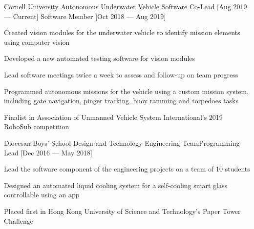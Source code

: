 \documentclass{resume}
\begin{document}
\begin{experience}
    \begin{entry}{Cornell University Autonomous Underwater
        Vehicle}{}{
        Software Co-Lead [Aug 2019 --- Current] \hfill \break Software
    Member [Oct 2018 --- Aug 2019]}
        \begin{description}
            \item Created vision modules for the underwater vehicle to identify
                mission elements using computer vision
            \item Developed a new automated testing software for vision modules
            \item Lead software meetings twice a week to assess and follow-up on
                team progress
            \item Programmed autonomous missions for the vehicle using a custom
                mission system, including gate navigation, pinger tracking, buoy
                ramming and torpedoes tasks
            \item Finalist in Association of Unmanned Vehicle System
                International's 2019 RoboSub competition
        \end{description}
    \end{entry}

    \begin{entry}{Diocesan Boys' School Design and Technology Engineering
        Team}{}{Programming Lead [Dec 2016 --- May 2018]}
        \begin{description}
            \item Lead the software component of the engineering projects on a
                team of 10 students
            \item Designed an automated liquid cooling system for a self-cooling
                smart glass controllable using an app
            \item Placed first in Hong Kong University of Science and
                Technology's Paper Tower Challenge
        \end{description}
    \end{entry}


\end{experience}
\end{document}
